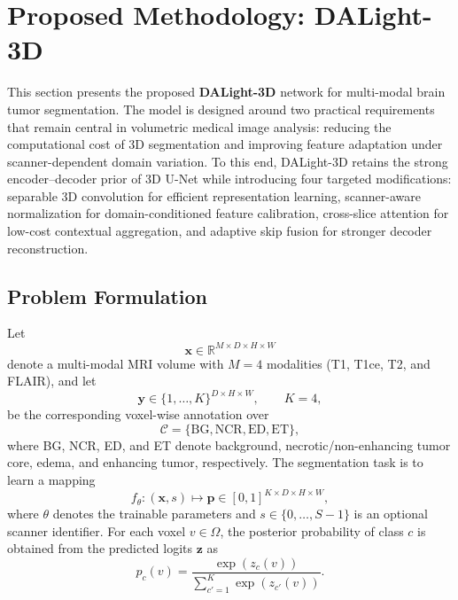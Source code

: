 \documentclass[conference]{IEEEtran}
\begin{document}
\section{Proposed Methodology: DALight-3D}
\label{sec:method}

This section presents the proposed \textbf{DALight-3D} network for multi-modal brain tumor segmentation. The model is designed around two practical requirements that remain central in volumetric medical image analysis: reducing the computational cost of 3D segmentation and improving feature adaptation under scanner-dependent domain variation. To this end, DALight-3D retains the strong encoder--decoder prior of 3D U-Net while introducing four targeted modifications: separable 3D convolution for efficient representation learning, scanner-aware normalization for domain-conditioned feature calibration, cross-slice attention for low-cost contextual aggregation, and adaptive skip fusion for stronger decoder reconstruction.

\subsection{Problem Formulation}
\label{sec:problem}

Let
\begin{equation}
\mathbf{x} \in \mathbb{R}^{M \times D \times H \times W}
\end{equation}
denote a multi-modal MRI volume with $M=4$ modalities (T1, T1ce, T2, and FLAIR), and let
\begin{equation}
\mathbf{y} \in \{1,\dots,K\}^{D \times H \times W}, \qquad K=4,
\end{equation}
be the corresponding voxel-wise annotation over
\[
\mathcal{C}=\{\text{BG},\text{NCR},\text{ED},\text{ET}\},
\]
where BG, NCR, ED, and ET denote background, necrotic/non-enhancing tumor core, edema, and enhancing tumor, respectively. The segmentation task is to learn a mapping
\begin{equation}
f_{\theta}:(\mathbf{x},s) \mapsto \mathbf{p} \in [0,1]^{K \times D \times H \times W},
\end{equation}
where $\theta$ denotes the trainable parameters and $s \in \{0,\dots,S-1\}$ is an optional scanner identifier. For each voxel $v \in \Omega$, the posterior probability of class $c$ is obtained from the predicted logits $\mathbf{z}$ as
\begin{equation}
p_c(v)=\frac{\exp(z_c(v))}{\sum_{c'=1}^{K}\exp(z_{c'}(v))}.
\end{equation}
\end{document}
